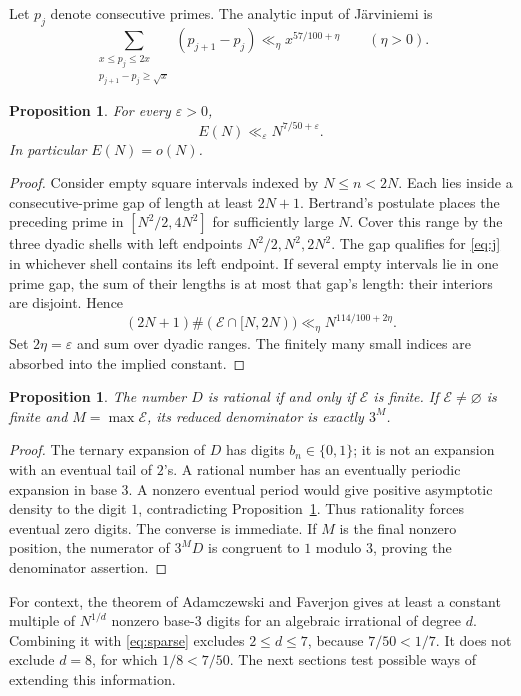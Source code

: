 \documentclass[11pt,a4paper]{article}
\newtheorem{proposition}[theorem]{Proposition}
\theoremstyle{definition}
\theoremstyle{remark}\newtheorem{remark}[theorem]{Remark}
\newcommand{\E}{\mathcal E}
\begin{document}
Let $p_j$ denote consecutive primes. The analytic input of
J\"arviniemi \cite[Theorem 1.1]{J} is
\begin{equation}\label{eq:j}
 \sum_{\substack{x\le p_j\le2x\\p_{j+1}-p_j\ge\sqrt x}}
 (p_{j+1}-p_j)\ll_\eta x^{57/100+\eta}
 \qquad(\eta>0).
\end{equation}

\begin{proposition}\label{prop:sparse}
For every $\varepsilon>0$,
\begin{equation}\label{eq:sparse}
 E(N)\ll_\varepsilon N^{7/50+\varepsilon}.
\end{equation}
In particular $E(N)=o(N)$.
\end{proposition}
\begin{proof}
Consider empty square intervals indexed by $N\le n<2N$. Each lies
inside a consecutive-prime gap of length at least $2N+1$.
Bertrand's postulate places the preceding prime in
$[N^2/2,4N^2]$ for sufficiently large $N$. Cover this range by the
three dyadic shells with left endpoints $N^2/2,N^2,2N^2$.
The gap qualifies for \eqref{eq:j} in whichever shell contains its
left endpoint. If several empty intervals lie in one prime gap, the
sum of their lengths is at most that gap's length: their interiors
are disjoint. Hence
\[
 (2N+1)\#(\E\cap[N,2N))
 \ll_\eta N^{114/100+2\eta}.
\]
Set $2\eta=\varepsilon$ and sum over dyadic ranges. The finitely many
small indices are absorbed into the implied constant.
\end{proof}

\begin{proposition}\label{prop:rational}
The number $D$ is rational if and only if $\E$ is finite. If
$\E\ne\varnothing$ is finite and $M=\max\E$, its reduced denominator
is exactly $3^M$.
\end{proposition}
\begin{proof}
The ternary expansion of $D$ has digits $b_n\in\{0,1\}$; it is not
an expansion with an eventual tail of $2$'s. A rational number has an
eventually periodic expansion in base $3$. A nonzero eventual period
would give positive asymptotic density to the digit $1$, contradicting
Proposition~\ref{prop:sparse}. Thus rationality forces eventual zero
digits. The converse is immediate. If $M$ is the final nonzero position,
the numerator of $3^MD$ is congruent to $1$ modulo $3$, proving the
denominator assertion.
\end{proof}

For context, the theorem of Adamczewski and Faverjon \cite{AF} gives
at least a constant multiple of $N^{1/d}$ nonzero base-$3$ digits for
an algebraic irrational of degree $d$. Combining it with
\eqref{eq:sparse} excludes $2\le d\le7$, because $7/50<1/7$.
It does not exclude $d=8$, for which $1/8<7/50$. The next sections
test possible ways of extending this information.
\end{document}
